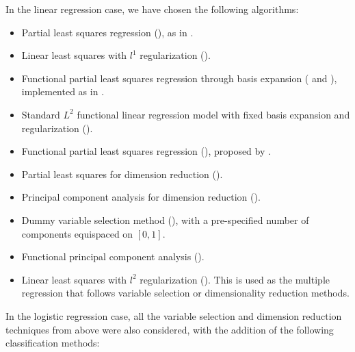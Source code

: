 In the linear regression case, we have chosen the following algorithms:

\begin{itemize}
  \item Partial least squares regression (), as in \citet{abdi2010partial}.
  \item Linear least squares with \(l^1\) regularization ().
  \item Functional partial least squares regression through basis expansion ( and ), implemented as in \citet{aguilera2010using}.
  \item Standard \(L^2\) functional linear regression model with fixed basis expansion and regularization ().
  \item Functional partial least squares regression (), proposed by \citet{delaigle2012methodology}.
  \item Partial least squares for dimension reduction ().
  \item Principal component analysis for dimension reduction ().
  \item Dummy variable selection method (), with a pre-specified number of components equispaced on \([0, 1]\).
  \item Functional principal component analysis ().
  \item Linear least squares with \(l^2\) regularization (). This is used as the multiple regression that follows variable selection or dimensionality reduction methods.
\end{itemize}

In the logistic regression case, all the variable selection and dimension reduction techniques from above were also considered, with the addition of the following classification methods:

